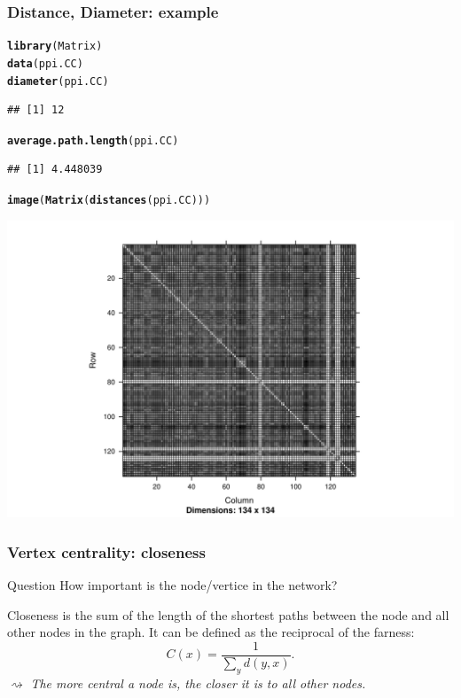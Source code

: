 \documentclass{beamer}\usepackage[]{graphicx}\usepackage[]{color}
\makeatletter
\newcommand{\hlstd}[1]{\textcolor[rgb]{0.345,0.345,0.345}{#1}}%
\newcommand{\hlkwd}[1]{\textcolor[rgb]{0.737,0.353,0.396}{\textbf{#1}}}%
\newenvironment{kframe}{%
 \def\at@end@of@kframe{}%
 \ifinner\ifhmode%
  \def\at@end@of@kframe{\end{minipage}}%
  \begin{minipage}{\columnwidth}%
 \fi\fi%
 \def\FrameCommand##1{\hskip\@totalleftmargin \hskip-\fboxsep
 \colorbox{shadecolor}{##1}\hskip-\fboxsep
     \hskip-\linewidth \hskip-\@totalleftmargin \hskip\columnwidth}%
 \MakeFramed {\advance\hsize-\width
   \@totalleftmargin\z@ \linewidth\hsize
   \@setminipage}}%
 {\par\unskip\endMakeFramed%
 \at@end@of@kframe}
\newenvironment{knitrout}{}{} %
\makeatother
\begin{document}
\begin{frame}
  \frametitle{Distance, Diameter: example}
\begin{knitrout}\scriptsize
{}\color{fgcolor}\begin{kframe}
\begin{alltt}
\hlkwd{library}\hlstd{(Matrix)}
\hlkwd{data}\hlstd{(ppi.CC)}
\hlkwd{diameter}\hlstd{(ppi.CC)}
\end{alltt}
\begin{verbatim}
## [1] 12
\end{verbatim}
\begin{alltt}
\hlkwd{average.path.length}\hlstd{(ppi.CC)}
\end{alltt}
\begin{verbatim}
## [1] 4.448039
\end{verbatim}
\begin{alltt}
\hlkwd{image}\hlstd{(}\hlkwd{Matrix}\hlstd{(}\hlkwd{distances}\hlstd{(ppi.CC)))}
\end{alltt}
\end{kframe}
\includegraphics[width=.8\textwidth]{figures/distances1-1} 

\end{knitrout}
\end{frame}

\begin{frame}
  \frametitle{Vertex centrality: closeness}

  \begin{block}{Question}
    How important is the node/vertice in the network?
  \end{block}

  \begin{definition}[Closeness]
    Closeness is the sum of the length of the shortest paths between the node and all other nodes in the graph. It can be defined as the reciprocal of the farness:
    \[C(x)={\frac  {1}{\sum _{y}d(y,x)}}.\]
    $\rightsquigarrow$ \textit{The more central a node is, the closer it is to all other nodes.}
  \end{definition}

\end{frame}
\end{document}
